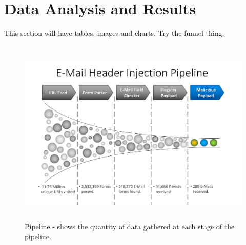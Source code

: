 \chapter[Results]{Data Analysis and Results}
This section will have tables, images and charts.
Try the funnel thing.

\begin{figure}
	\centering
	\includegraphics[width=14cm, height=9cm]{Results/emailheaderpipeline}
	\caption{Pipeline - shows the quantity of data gathered at each stage of the pipeline.}
	\label{fig:pipeline}
\end{figure}



